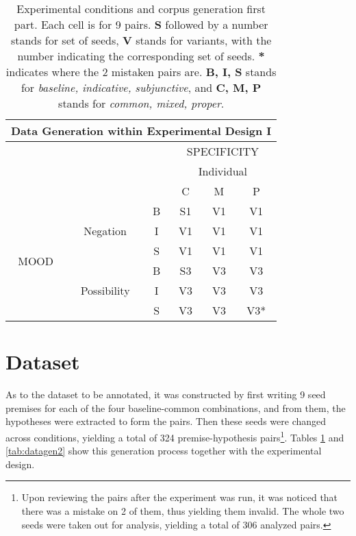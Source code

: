 \begin{table}[h!]
\centering
\begin{tabular}{|c|c|c|c|c|c|}
\hline
\multicolumn{6}{|c|}{Data Generation within Experimental Design I}\\\hline
                      & & &\multicolumn{3}{c|}{SPECIFICITY} \\\cline{4-6} 
                      & & & \multicolumn{3}{c|}{Individual}\\\cline{4-6} 
                      & & & C & M & P\\\hline 
\multirow{6}{*}{MOOD} & \multirow{3}{*}{Negation} & B & S1 & V1 &V1\\\cline{3-6}
                      &                           & I & V1 & V1 &V1\\\cline{3-6}
                      &                           & S & V1  &V1 &V1\\ \cline{2-6}\cline{2-6}                     
                      &\multirow{3}{*}{Possibility}& B & S3 &V3& V3 \\\cline{3-6}
                      &                           & I & V3 & V3 & V3\\\cline{3-6}
                      &                           & S & V3 & V3 & V3*\\\hline                                                          
\end{tabular}
\caption[Experimental conditions and corpus generation I.]{Experimental conditions and corpus generation first part. Each cell is for 9 pairs. \textbf{S} followed by a number stands for set of seeds, \textbf{V} stands for variants, with the number indicating the corresponding set of seeds. \textbf{*} indicates where the 2 mistaken pairs are. \textbf{B, I, S} stands for \textit{baseline, indicative, subjunctive}, and \textbf{C, M, P} stands for \textit{common, mixed, proper}.}
\label{tab:datagen1}
\end{table}

\section{Dataset}
As to the dataset to be annotated, it was constructed by first writing 9 seed premises for each of the four baseline-common combinations, and from them, the hypotheses were extracted to form the pairs. Then these seeds were changed across conditions, yielding a total of 324 premise-hypothesis pairs\footnote{Upon reviewing the pairs after the experiment was run, it was noticed that there was a mistake on 2 of them, thus yielding them invalid. The whole two seeds were taken out for analysis, yielding a total of 306 analyzed pairs.}. Tables \ref{tab:datagen1} and \ref{tab:datagen2} show this generation process together with the experimental design.\\

